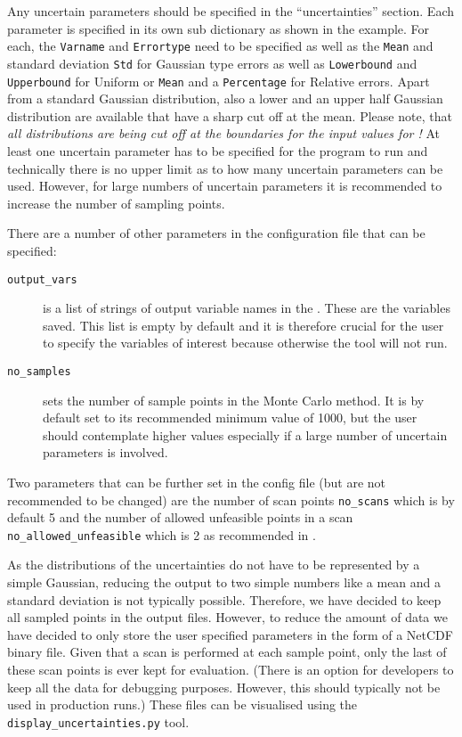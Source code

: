 Any uncertain parameters should be specified in the ``uncertainties''
section. Each parameter is specified in its own sub dictionary as shown in the
example. For each, the \texttt{Varname} and \texttt{Errortype} need to be
specified as well as the \texttt{Mean} and standard deviation \texttt{Std} for
Gaussian type errors as well as \texttt{Lowerbound} and \texttt{Upperbound}
for Uniform or \texttt{Mean} and a \texttt{Percentage} for Relative errors. Apart from a standard Gaussian distribution, also a lower and an upper half Gaussian distribution are available that have a sharp cut off at the mean. Please note, that \emph{all distributions are being cut off at the boundaries for the input values for \process!}  At
least one uncertain parameter has to be specified for the program to run and
technically there is no upper limit as to how many uncertain parameters can be
used. However, for large numbers of uncertain parameters it is recommended to
increase the number of sampling points.

There are a number of other parameters in the configuration file that can be specified:
\begin{description}
\item[\texttt{output\_vars}] is a list of strings of output variable names in
  the \mfile. These are the variables saved. This list is empty by default and
  it is therefore crucial for the user to specify the variables of interest
  because otherwise the tool will not run.
\item[\texttt{no\_samples}] sets the number of sample points in the Monte
  Carlo method. It is by default set to its recommended minimum value of 1000,
  but the user should contemplate higher values especially if a large number
  of uncertain parameters is involved.
\end{description}
Two parameters that can be further set in the config file (but are not
recommended to be changed) are the number of scan points \texttt{no\_scans}
which is by default 5 and the number of allowed unfeasible points in a scan
\texttt{no\_allowed\_unfeasible} which is 2 as recommended in
\cite{WPPMI2014Report}.

As the distributions of the uncertainties do not have to be represented by a
simple Gaussian, reducing the output to two simple numbers like a mean and a
standard deviation is not typically possible. Therefore, we have decided to
keep all sampled points in the output files. However, to reduce the amount of
data we have decided to only store the user specified parameters in the form
of a NetCDF binary file. Given that a scan is performed at each sample point,
only the last of these scan points is ever kept for evaluation. (There is an
option for developers to keep all the data for debugging purposes. However,
this should typically not be used in production runs.) These files can be
visualised using the \texttt{display\_uncertainties.py} tool.


